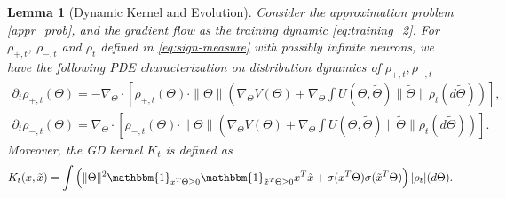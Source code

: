 \documentclass[11pt]{article}
\numberwithin{equation}{section}
\newtheorem{lemma}{Lemma}[section]
\begin{document}
\begin{lemma}[Dynamic Kernel and Evolution]
    \label{lem:pdf-sign-measure}
    Consider the approximation problem \eqref{appr_prob}, and the gradient flow as the training dynamic \eqref{eq:training_2}. For $\rho_{+, t}$, $\rho_{-, t}$ and $\rho_{t}$ defined in \eqref{eq:sign-measure} with possibly infinite neurons, we have the following PDE characterization on distribution dynamics of $\rho_{+, t},\rho_{-, t}$
    \begin{align}\label{def:training-infinite}
        \partial_t\rho_{+,t}(\Theta) = - \nabla_{\Theta} \cdot\left[\rho_{+,t}(\Theta) \cdot \|\Theta\| \left( \nabla _{\Theta}V(\Theta)+ \nabla_{\Theta}\int U(\Theta,\tilde\Theta)\|\tilde\Theta\|\rho_t(d \tilde\Theta)\right)\right], \nonumber\\
        \partial_t\rho_{-,t}(\Theta) = \nabla_{\Theta} \cdot\left[ \rho_{-,t}(\Theta)\cdot \|\Theta\| \left( \nabla _{\Theta}V(\Theta)+ \nabla_{\Theta}\int U(\Theta,\tilde\Theta)\|\tilde\Theta\|\rho_t(d \tilde\Theta)\right)\right].
    \end{align} 
    Moreover, the GD kernel $K_t$ is defined as
    \begin{align}
        \label{eq:k}
        K_{t}(x,\tilde x)= \int \left(\|\Theta\|^2\mathbbm{1}_{x^T\Theta\geq0}\mathbbm{1}_{\tilde x^T\Theta\geq0}x^T \tilde x + \sigma(x^T\Theta)\sigma(\tilde x^T\Theta) \right) |\rho_t|(d\Theta).
    \end{align}
\end{lemma}
\end{document}
